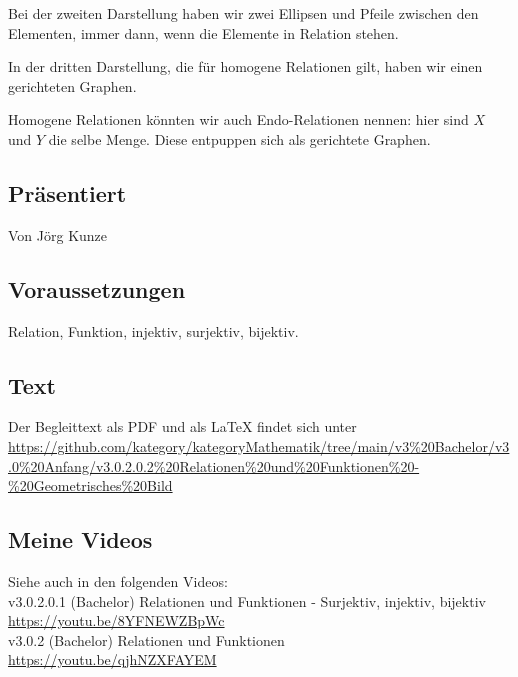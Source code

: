 \documentclass[a4paper]{amsart}
\theoremstyle{definition}
\begin{document}
Bei der zweiten Darstellung haben wir zwei Ellipsen und Pfeile zwischen den Elementen, immer dann, wenn die Elemente in Relation stehen.

In der dritten Darstellung, die für homogene Relationen gilt, haben wir einen gerichteten Graphen.

Homogene Relationen könnten wir auch Endo-Relationen nennen: hier sind $X$ und $Y$ die selbe Menge. Diese entpuppen sich als gerichtete Graphen.


\subsection*{Präsentiert}
Von Jörg Kunze

\subsection*{Voraussetzungen}
Relation, Funktion, injektiv, surjektiv, bijektiv.

\subsection*{Text}
Der Begleittext als PDF und als LaTeX findet sich unter
{\tiny
   \url{https://github.com/kategory/kategoryMathematik/tree/main/v3%20Bachelor/v3.0%20Anfang/v3.0.2.0.2%20Relationen%20und%20Funktionen%20-%20Geometrisches%20Bild}
}

\subsection*{Meine Videos}
Siehe auch in den folgenden Videos:\\
v3.0.2.0.1 (Bachelor) Relationen und Funktionen - Surjektiv, injektiv, bijektiv\\
\url{https://youtu.be/8YFNEWZBpWc}\\
v3.0.2 (Bachelor) Relationen und Funktionen\\
\url{https://youtu.be/qjhNZXFAYEM}
\end{document}
